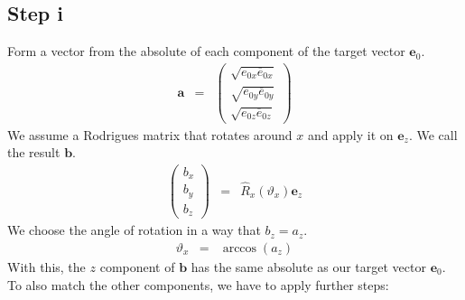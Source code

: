 \documentclass[12pt,a4paper,twoside,openright,BCOR10mm,headsepline,titlepage,abstracton,chapterprefix,final]{scrreprt}
\newcommand\Vector[1]{{\mathbf{#1}}}
\begin{document}
\subsection{Step i}
Form a vector from the absolute of each component of the target vector $\Vector{e}_0$.
\begin{eqnarray}
 \Vector{a} &=&
 \begin{pmatrix}
  \sqrt{ e_{0x} \overline{e}_{0x} } \\
  \sqrt{ e_{0y} \overline{e}_{0y} } \\
  \sqrt{ e_{0z} \overline{e}_{0z} }
 \end{pmatrix}
\end{eqnarray}
We assume a Rodrigues matrix that rotates around $x$ and apply it on $\Vector{e}_z$.
We call the result $\Vector{b}$.
\begin{eqnarray}
 \begin{pmatrix}
  b_x \\ b_y \\ b_z
 \end{pmatrix}
 &=&
 \hat{R}_x(\vartheta_x) \Vector{e}_z
\end{eqnarray}
We choose the angle of rotation in a way that $b_z = a_z$.
\begin{eqnarray}
 \vartheta_x &=& \arccos(a_z)
\end{eqnarray}
With this, the $z$ component of $\Vector{b}$ has the same absolute as our target vector $\Vector{e}_0$.
To also match the other components, we have to apply further steps:
\end{document}
